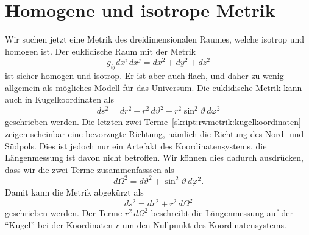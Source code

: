 \section{Homogene und isotrope Metrik%
\label{skript:robertson:himetrik}}
Wir suchen jetzt eine Metrik des dreidimensionalen Raumes, welche
isotrop und homogen ist.
Der euklidische Raum mit der Metrik
\[
g_{ij}dx^i\,dx^j
=
dx^2 + dy^2 + dz^2
\]
ist sicher homogen und isotrop. 
Er ist aber auch flach, und daher zu wenig allgemein als mögliches
Modell für das Universum.
Die euklidische Metrik kann auch in Kugelkoordinaten als
\begin{equation}
ds^2
=
dr^2
+ 
r^2\,d\vartheta^2
+
r^2\sin^2\vartheta\,d\varphi^2
\label{skript:rwmetrik:kugelkoordinaten}
\end{equation}
geschrieben werden.
Die letzten zwei Terme~\eqref{skript:rwmetrik:kugelkoordinaten}
zeigen scheinbar eine bevorzugte Richtung, nämlich die Richtung
des Nord- und Südpols.
Dies ist jedoch nur ein Artefakt des Koordinatensystems, die 
Längenmessung ist davon nicht betroffen.
Wir können dies dadurch ausdrücken, dass wir die zwei Terme
zusammenfasssen als
\begin{equation}
d\Omega^2 = d\vartheta^2 + \sin^2\vartheta\,d\varphi^2.
\end{equation}
Damit kann die Metrik abgekürzt als
\begin{equation}
ds^2 = dr^2 + r^2\,d\Omega^2
\end{equation}
geschrieben werden.
Der Terme $r^2\,d\Omega^2$ beschreibt die Längenmessung auf der
``Kugel'' bei der Koordinaten $r$ um den Nullpunkt des
Koordinatensystems.

